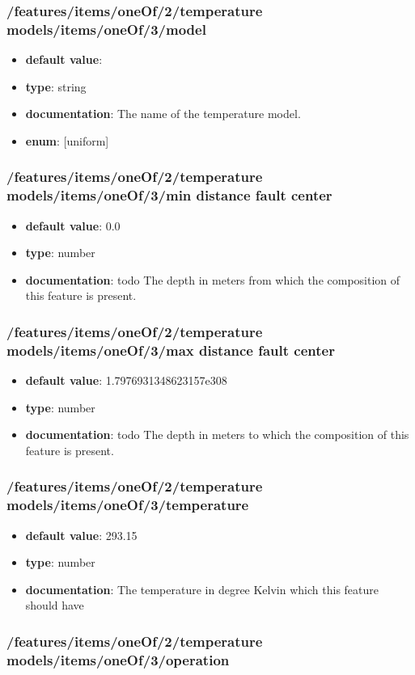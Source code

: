 \subsubsection{/features/items/oneOf/2/temperature models/items/oneOf/3/model}
\begin{itemize}\item {\bf default value}: 
\item {\bf type}: string
\item {\bf documentation}: The name of the temperature model.
\item {\bf enum}: [uniform]\end{itemize}\subsubsection{/features/items/oneOf/2/temperature models/items/oneOf/3/min distance fault center}
\begin{itemize}\item {\bf default value}: 0.0
\item {\bf type}: number
\item {\bf documentation}: todo The depth in meters from which the composition of this feature is present.
\end{itemize}\subsubsection{/features/items/oneOf/2/temperature models/items/oneOf/3/max distance fault center}
\begin{itemize}\item {\bf default value}: 1.7976931348623157e308
\item {\bf type}: number
\item {\bf documentation}: todo The depth in meters to which the composition of this feature is present.
\end{itemize}\subsubsection{/features/items/oneOf/2/temperature models/items/oneOf/3/temperature}
\begin{itemize}\item {\bf default value}: 293.15
\item {\bf type}: number
\item {\bf documentation}: The temperature in degree Kelvin which this feature should have
\end{itemize}\subsubsection{/features/items/oneOf/2/temperature models/items/oneOf/3/operation}
